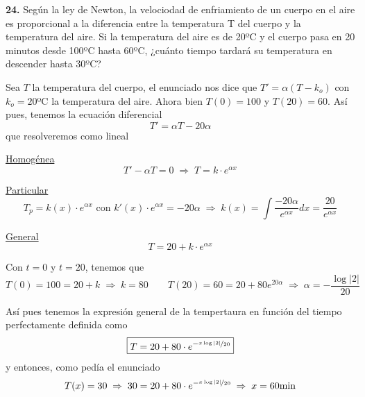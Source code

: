 \begin{ejer}
    \textbf{24.} Según la ley de Newton, la velociodad de enfriamiento de un cuerpo en el aire es proporcional a la diferencia entre la temperatura T del cuerpo y la temperatura del aire. Si la temperatura del aire es de 20ºC y el cuerpo pasa en 20 minutos
desde 100ºC hasta 60ºC, ¿cuánto tiempo tardará su temperatura en descender
hasta 30ºC?
\end{ejer}
\begin{sol}
    Sea $T$ la temperatura del cuerpo, el enunciado nos dice que $T'=\alpha(T-k_o)$ con $k_o=20$ºC la temperatura del aire. Ahora bien $T(0)=100$ y $T(20)=60$. Así pues, tenemos la ecuación diferencial
    $$T'=\alpha T-20\alpha $$
    que resolveremos como lineal

    \underline{Homogénea}
    $$T'-\alpha T=0 \; \Rightarrow \; T=k \cdot e^{\alpha x}$$

    \underline{Particular}
    $$T_p=k(x) \cdot e^{\alpha x} \text{ con } k'(x)\cdot e^{\alpha x}=-20\alpha \; \Rightarrow \; k(x)=\int \dfrac{-20\alpha }{e^{\alpha x}}dx=\dfrac{20}{e^{\alpha x}}$$

    \underline{General}
    $$T=20+k \cdot e^{\alpha x}$$

    Con $t=0$ y $t=20$, tenemos que 
    $$T(0)=100=20+k \; \Rightarrow \; k=80 \qquad T(20)=60=20+80e^{20\alpha} \; \Rightarrow \; \alpha=-\dfrac{\log |2|}{20}$$

    Así pues tenemos la expresión general de la tempertaura en función del tiempo perfectamente definida como 
    $$\boxed{T=20+80 \cdot e^{-\nicefrac{x \log |2| }{20}}}$$
    y entonces, como pedía el enunciado
    $$T(x)=30 \; \Rightarrow \; 30=20+80 \cdot e^{-\nicefrac{x \log |2| }{20}} \; \Rightarrow \; x=60 \text{min}$$
\end{sol}

